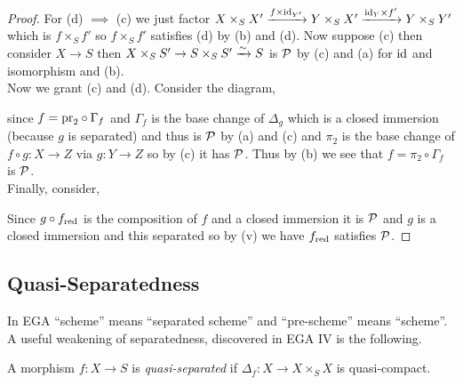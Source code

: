 \documentclass[12pt]{article}
\begin{document}
\begin{proof}
For (d) $\implies$ (c) we just factor $X \times_S X' \xrightarrow{f \times \mathrm{id}_{Y'}} Y \times_S X' \xrightarrow{\mathrm{id}_Y \times f'} Y \times_S Y'$ which is $f \times_S f'$ so $f \times_S f'$ satisfies (d) by (b) and (d). Now suppose (c) then consider $X \to S$ then $X \times_S S' \to S \times_S S' \xrightarrow{\sim} S$ is $\mathcal{P}$ by (c) and (a) for $\mathrm{id}$ and isomorphism and (b). 
\bigskip\\
Now we grant (c) and (d). Consider the diagram,
\begin{center}
\end{center}
since $f = \mathrm{pr}_2 \circ \Gamma_f$ and $\Gamma_f$ is the base change of $\Delta_g$ which is a closed immersion (because $g$ is separated) and thus is $\mathcal{P}$ by (a) and (c) and $\pi_2$ is the base change of $f \circ g : X \to Z$ via $g : Y \to Z$ so by (c) it has $\mathcal{P}$. Thus by (b) we see that $f = \pi_2 \circ \Gamma_f$ is $\mathcal{P}$.
\bigskip\\
Finally, consider,
\begin{center}
\end{center}
Since $g \circ f_{\mathrm{red}}$ is the composition of $f$ and a closed immersion it is $\mathcal{P}$ and $g$ is a closed immersion and this separated so by (v) we have $f_{\mathrm{red}}$ satisfies $\mathcal{P}$.
\end{proof}

\subsection{Quasi-Separatedness}

In EGA ``scheme'' means ``separated scheme'' and ``pre-scheme'' means ``scheme''. A useful weakening of separatedness, discovered in EGA IV is the following.

\begin{defn}
A morphism $f : X \to S$ is \textit{quasi-separated} if $\Delta_f : X \to X \times_S X$ is quasi-compact.
\end{defn}
\end{document}
